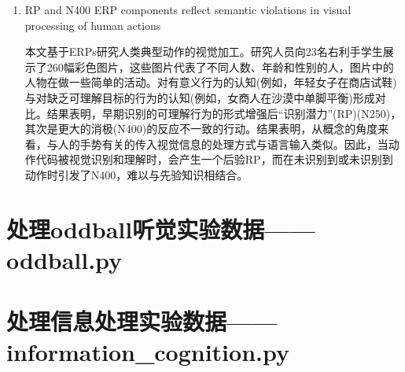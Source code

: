 \documentclass{hitreport}
\begin{document}
\begin{enumerate}
\item RP and N400 ERP components reflect semantic violations in visual processing of human actions\cite{Proverbio2009}

\hspace{2em}本文基于ERPs研究人类典型动作的视觉加工。研究人员向23名右利手学生展示了260幅彩色图片，这些图片代表了不同人数、年龄和性别的人，图片中的人物在做一些简单的活动。对有意义行为的认知(例如，年轻女子在商店试鞋)与对缺乏可理解目标的行为的认知(例如，女商人在沙漠中单脚平衡)形成对比。结果表明，早期识别的可理解行为的形式增强后“识别潜力”(RP)(N250)，其次是更大的消极(N400)的反应不一致的行动。结果表明，从概念的角度来看，与人的手势有关的传入视觉信息的处理方式与语言输入类似。因此，当动作代码被视觉识别和理解时，会产生一个后验RP，而在未识别到或未识别到动作时引发了N400，难以与先验知识相结合。



\end{enumerate}


\newpage

\renewcommand\refname{参考文献}
 
 

\newpage
\begin{appendices}

\section{处理oddball听觉实验数据——oddball.py}\label{app:oddball}



\section{处理信息处理实验数据——information\_cognition.py}\label{app:information}


%
%
%
%
%
%

\end{appendices}
\end{document}
